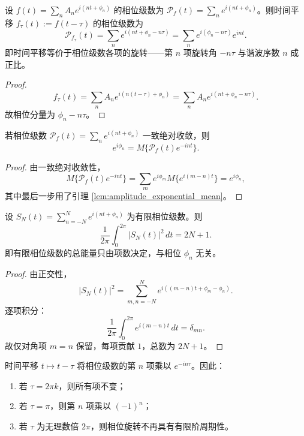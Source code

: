 \begin{proposition}[相位级数与时间平移]\label{prop:phase_translation}
设 $f(t)=\sum_n A_n e^{i(nt+\phi_n)}$ 的相位级数为 $\mathcal{P}_f(t)=\sum_n e^{i(nt+\phi_n)}$。则时间平移 $f_\tau(t):=f(t-\tau)$ 的相位级数为
\[
\mathcal{P}_{f_\tau}(t)
= \sum_n e^{i(nt+\phi_n-n\tau)}
= \sum_n e^{i(\phi_n-n\tau)}e^{int}.
\]
即时间平移等价于相位级数各项的旋转——第 $n$ 项旋转角 $-n\tau$ 与谐波序数 $n$ 成正比。
\end{proposition}

\begin{proof}
\[
f_\tau(t)=\sum_n A_n e^{i(n(t-\tau)+\phi_n)}
=\sum_n A_n e^{i(nt+\phi_n-n\tau)}.
\]
故相位分量为 $\phi_n-n\tau$。
\end{proof}

\begin{lemma}[相位级数的玻尔均值系数公式]\label{lem:phase_bohr_mean}
若相位级数 $\mathcal{P}_f(t)=\sum_n e^{i(nt+\phi_n)}$ 一致绝对收敛，则
\[
e^{i\phi_n}
= M\{\mathcal{P}_f(t)e^{-int}\}.
\]
\end{lemma}

\begin{proof}
由一致绝对收敛性，
\[
M\{\mathcal{P}_f(t)e^{-int}\}
= \sum_m e^{i\phi_m} M\{e^{i(m-n)t}\}
= e^{i\phi_n},
\]
其中最后一步用了引理 \ref{lem:amplitude_exponential_mean}。
\end{proof}

\begin{theorem}[有限相位级数的模长守恒]\label{thm:phase_modulus_conservation}
设 $S_N(t)=\sum_{n=-N}^{N} e^{i(nt+\phi_n)}$ 为有限相位级数。则
\[
\frac{1}{2\pi}\int_0^{2\pi}|S_N(t)|^2\,dt = 2N+1.
\]
即有限相位级数的总能量只由项数决定，与相位 $\phi_n$ 无关。
\end{theorem}

\begin{proof}
由正交性，
\[
|S_N(t)|^2
= \sum_{m,n=-N}^{N} e^{i((m-n)t+\phi_m-\phi_n)}.
\]
逐项积分：
\[
\frac{1}{2\pi}\int_0^{2\pi} e^{i(m-n)t}\,dt = \delta_{mn}.
\]
故仅对角项 $m=n$ 保留，每项贡献 $1$，总数为 $2N+1$。
\end{proof}

\begin{corollary}[时间平移的相位旋转规则]\label{cor:phase_time_shift_rotation}
时间平移 $t\mapsto t-\tau$ 将相位级数的第 $n$ 项乘以 $e^{-in\tau}$。因此：
\begin{enumerate}[label=(\roman*)]
    \item 若 $\tau=2\pi k$，则所有项不变；
    \item 若 $\tau=\pi$，则第 $n$ 项乘以 $(-1)^n$；
    \item 若 $\tau$ 为无理数倍 $2\pi$，则相位旋转不再具有有限阶周期性。
\end{enumerate}
\end{corollary}

